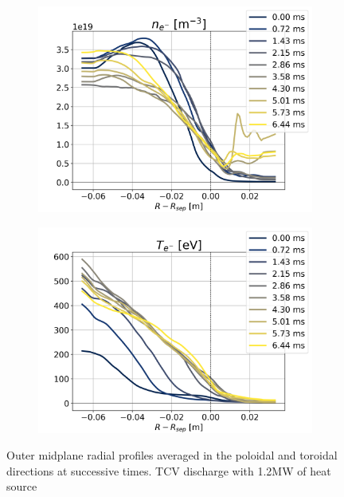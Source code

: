 \begin{figure}[H]\centering
	\begin{subfigure}[t]{0.45\textwidth}
		\centering
		\includegraphics[width=1\textwidth]{schemes/OMP_profiles_e-_n_Hmode.png}
		\label{fig:TCV_highPower_OMPn}
	\end{subfigure}
	\begin{subfigure}[t]{0.45\textwidth}
		\centering
		\includegraphics[width=1\textwidth]{schemes/OMP_profiles_e-_T_Hmode.png}
		\label{fig:TCV_highPower_OMPT}
	\end{subfigure}
	\caption[Outer midplane radial profiles averaged in the poloidal and toroidal directions at successive times. TCV discharge with 1.2MW of heat source]{Outer midplane radial profiles averaged in the poloidal and toroidal directions at successive times. TCV discharge with 1.2MW of heat source}
	\label{fig:TCV_highPower_OMP}
\end{figure}

